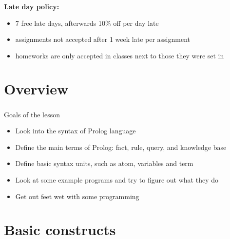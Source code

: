 \begin{frame}
	\frametitle{\insertsection}
	\textbf{Late day policy:}
	\begin{itemize}
		\item 7 free late days, afterwards 10\% off per day late
		\item assignments not accepted after 1 week late per assignment
		\item homeworks are only accepted in classes next to those they were set in
	\end{itemize}
\end{frame}


\section{Overview}

\begin{frame}
	\frametitle{\insertsection}
	Goals of the lesson
	\begin{itemize}
		\item Look into the syntax of Prolog language
		\item Define the main terms of Prolog: fact, rule, query, and knowledge base
		\item Define basic syntax units, such as atom, variables and term
		\item Look at some example programs and try to figure out what they do
		\item Get out feet wet with some programming
	\end{itemize}
\end{frame}


\section{Basic constructs}

